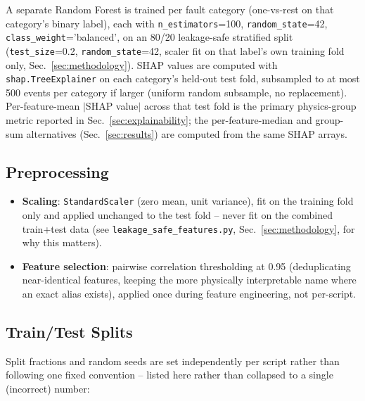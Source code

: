 A separate Random Forest is trained per fault category (one-vs-rest on that category's binary label), each with \texttt{n\_estimators}=100, \texttt{random\_state}=42, \texttt{class\_weight}='balanced', on an 80/20 leakage-safe stratified split (\texttt{test\_size}=0.2, \texttt{random\_state}=42, scaler fit on that label's own training fold only, Sec.~\ref{sec:methodology}). %
SHAP values are computed with \texttt{shap.TreeExplainer} on each category's held-out test fold, subsampled to at most 500 events per category if larger (uniform random subsample, no replacement). Per-feature-mean $|$SHAP value$|$ across that test fold is the primary physics-group metric reported in Sec.~\ref{sec:explainability}; the per-feature-median and group-sum alternatives (Sec.~\ref{sec:results}) are computed from the same SHAP arrays. %

\subsection{Preprocessing}

\begin{itemize}
    \item \textbf{Scaling}: \texttt{StandardScaler} (zero mean, unit variance), fit on the training fold only and applied unchanged to the test fold -- never fit on the combined train+test data (see \texttt{leakage\_safe\_features.py}, Sec.~\ref{sec:methodology}, for why this matters).
    \item \textbf{Feature selection}: pairwise correlation thresholding at 0.95 (deduplicating near-identical features, keeping the more physically interpretable name where an exact alias exists), applied once during feature engineering, not per-script.  %
\end{itemize}

\subsection{Train/Test Splits}

Split fractions and random seeds are set independently per script rather than following one fixed convention -- listed here rather than collapsed to a single (incorrect) number:

